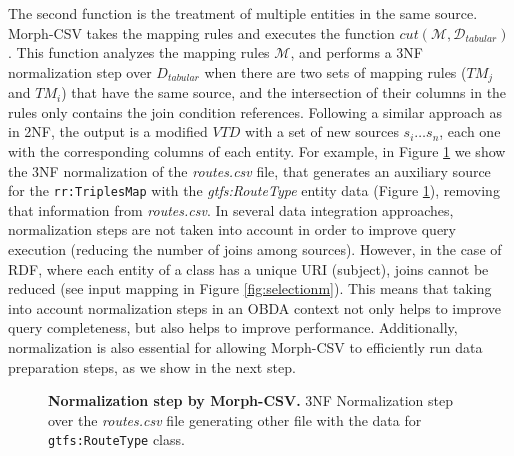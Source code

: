 The second function is the treatment of multiple entities in the same source. Morph-CSV takes the mapping rules and executes the function $cut(\mathcal{M},\mathcal{D}_{tabular})$. This function analyzes the mapping rules $\mathcal{M}$, and performs a 3NF~\citep{codd1979extending} normalization step over ${D}_{tabular}$ when there are two sets of mapping rules ($TM_j$ and $TM_i$) that have the same source, and the intersection of their columns in the rules only contains the join condition references. Following a similar approach as in 2NF, the output is a modified $VTD$ with a set of new sources $s_i\ldots s_n$, each one with the corresponding columns of each entity. For example, in Figure \ref{fig:normalization} we show the 3NF normalization of the \textit{routes.csv} file, that generates an auxiliary source for the \texttt{rr:TriplesMap} with the \textit{gtfs:RouteType} entity data (Figure \ref{fig:normalization}), removing that information from \textit{routes.csv}. In several data integration approaches, normalization steps are not taken into account in order to improve query execution (reducing the number of joins among sources). However, in the case of RDF, where each entity of a class has a unique URI (subject), joins cannot be reduced (see input mapping in Figure \ref{fig:selectionm}). This means that taking into account normalization steps in an OBDA context not only helps to improve query completeness, but also helps to improve performance. Additionally, normalization is also essential for allowing Morph-CSV to efficiently run data preparation steps, as we show in the next step.

\begin{figure}[th]
\centering
{}
\caption[Normalization step by Morph-CSV]{\textbf{Normalization step by Morph-CSV.} 3NF Normalization step over the \textit{routes.csv} file generating other file with the data for \texttt{gtfs:RouteType} class.}
\label{fig:normalization}
\end{figure}

